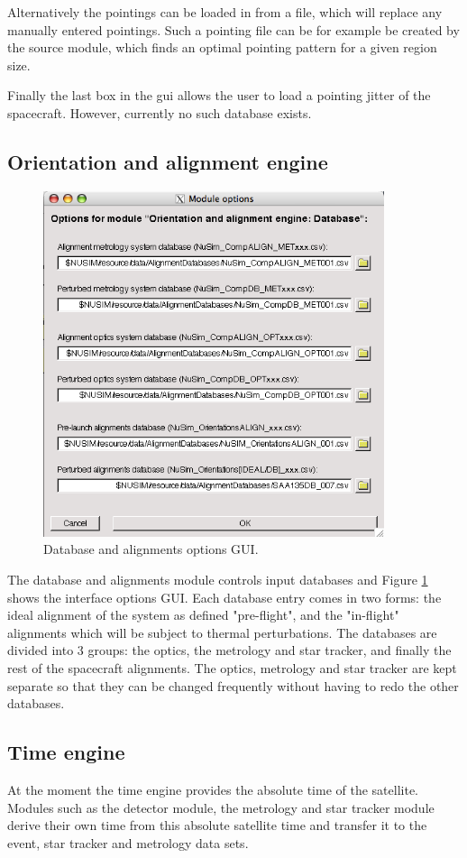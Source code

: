 Alternatively the pointings can be loaded in from a file, which will replace any manually entered pointings. Such a pointing file can be for example be created by the source module, which finds an optimal pointing pattern for a given region size.

Finally the last box in the gui allows the user to load a pointing jitter of the spacecraft. However, currently no such database exists.

\subsection{Orientation and alignment engine}
\begin{figure}[tb]
\begin{center}
\includegraphics[width=10cm]{images/DBgui.png}  
\caption{Database and alignments options GUI.}
\label{dbgui} 
\end{center}
\end{figure}

The database and alignments module controls input databases and Figure \ref{dbgui} shows the interface options GUI. Each database entry comes in two forms: the ideal alignment of the system as defined "pre-flight", and the "in-flight" alignments which will be subject to thermal perturbations. The databases are divided into 3 groups: the optics, the metrology and star tracker, and finally the rest of the spacecraft alignments. The optics, metrology and star tracker are kept separate so that they can be changed frequently without having to redo the other databases.

\subsection{Time engine}
At the moment the time engine provides the absolute time of the satellite. Modules such as the detector module, the metrology and star tracker module derive their own time from this absolute satellite time and transfer it to the event, star tracker and metrology data sets.   

